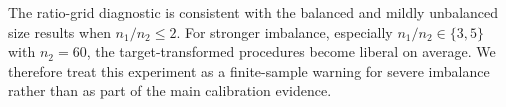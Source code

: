 \documentclass[
  12pt]{article}
\theoremstyle{plain}
\theoremstyle{definition}
\theoremstyle{remark}
\begin{document}
\begin{table}[!htbp]
\centering
\footnotesize
\caption{Average empirical size in the unbalanced-ratio diagnostic with
\(\rho_0=0.5\), \(n_2=60\), \(R=1000\), and \(B=500\).  Each row averages over
the two covariance families and the three innovation distributions.}
\label{tab:supp_unbalanced_ratio}

\end{table}

The ratio-grid diagnostic is consistent with the balanced and mildly
unbalanced size results when \(n_1/n_2\le 2\).  For stronger imbalance,
especially \(n_1/n_2\in\{3,5\}\) with \(n_2=60\), the target-transformed
procedures become liberal on average.  We therefore treat this experiment as a
finite-sample warning for severe imbalance rather than as part of the main
calibration evidence.



\end{document}

